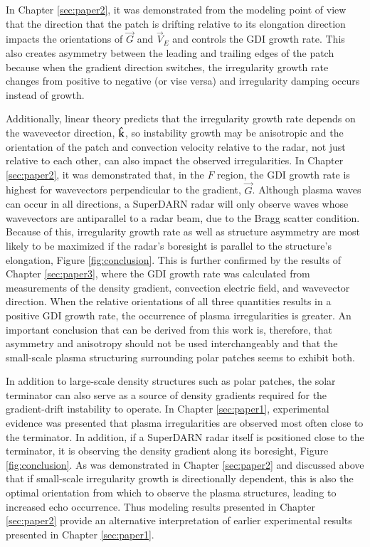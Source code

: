 In Chapter \ref{sec:paper2}, it was demonstrated from the modeling point of view that the direction that the patch is drifting relative to its elongation direction impacts the orientations of \(\vec{G}\) and \(\vec{V}_E\) and controls the GDI growth rate.  This also creates asymmetry between the leading and trailing edges of the patch because when the gradient direction switches, the irregularity growth rate changes from positive to negative (or vise versa) and irregularity damping occurs instead of growth.  

Additionally, linear theory predicts that the irregularity growth rate depends on the wavevector direction, \(\mathbf{\hat{k}}\), so instability growth may be anisotropic and the orientation of the patch and convection velocity relative to the radar, not just relative to each other, can also impact the observed irregularities.  In Chapter \ref{sec:paper2}, it was demonstrated that, in the \(F\) region, the GDI growth rate is highest for wavevectors perpendicular to the gradient, \(\vec{G}\).  Although plasma waves can occur in all directions, a SuperDARN radar will only observe waves whose wavevectors are antiparallel to a radar beam, due to the Bragg scatter condition.  Because of this, irregularity growth rate as well as structure asymmetry are most likely to be maximized if the radar's boresight is parallel to the structure's elongation, Figure \ref{fig:conclusion}.  This is further confirmed by the results of Chapter \ref{sec:paper3}, where the GDI growth rate was calculated from measurements of the density gradient, convection electric field, and wavevector direction.  When the relative orientations of all three quantities results in a positive GDI growth rate, the occurrence of plasma irregularities is greater.  An important conclusion that can be derived from this work is, therefore, that asymmetry and anisotropy should not be used interchangeably and that the small-scale plasma structuring surrounding polar patches seems to exhibit both.

In addition to large-scale density structures such as polar patches, the solar terminator can also serve as a source of density gradients required for the gradient-drift instability to operate.  In Chapter \ref{sec:paper1}, experimental evidence was presented that plasma irregularities are observed most often close to the terminator.  In addition, if a SuperDARN radar itself is positioned close to the terminator, it is observing the density gradient along its boresight, Figure \ref{fig:conclusion}.  As was demonstrated in Chapter \ref{sec:paper2} and discussed above that if small-scale irregularity growth is directionally dependent, this is also the optimal orientation from which to observe the plasma structures, leading to increased echo occurrence.  Thus modeling results presented in Chapter \ref{sec:paper2} provide an alternative interpretation of earlier experimental results presented in Chapter \ref{sec:paper1}.



